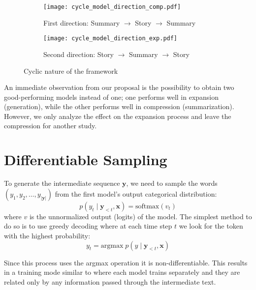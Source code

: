 \begin{figure}[ht]
    \centering
    \begin{subfigure}[b]{\textwidth}
        \centering
       \texttt{[image: cycle\_model\_direction\_comp.pdf]}
        \caption{First direction: Summary $\rightarrow$ Story $\rightarrow$ Summary}
        \label{fig:cycle_model_direction_comp}
    \end{subfigure}
    \newline \newline
    \begin{subfigure}[b]{\textwidth}
        \centering
       \texttt{[image: cycle\_model\_direction\_exp.pdf]}
        \caption{Second direction: Story $\rightarrow$ Summary $\rightarrow$ Story}
        \label{fig:cycle_model_direction_exp}
    \end{subfigure}
    \caption{Cyclic nature of the framework}
    \label{fig:cycle_directions}
\end{figure}

An immediate observation from our proposal is the possibility to obtain two good-performing models instead of one; one performs well in expansion (generation), while the other performs well in compression (summarization). However, we only analyze the effect on the expansion process and leave the compression for another study.



\section{Differentiable Sampling}
\label{sec:gumbel_softmax}

To generate the intermediate sequence $\mathbf{y}$, we need to sample the words $(y_1, y_2, \ldots, y_{|\mathbf{y}|})$ from the first model's output categorical distribution: 
\[ p(y_t \mid \mathbf{y}_{<t}, \mathbf{x}) = \text{softmax}(v_t) \]
where $v$ is the unnormalized output (logits) of the model. The simplest method to do so is to use greedy decoding where at each time step $t$ we look for the token with the highest probability:
\[ y_t = \text{argmax} \; p(y \mid \mathbf{y}_{<t}, \mathbf{x}) \]

Since this process uses the argmax operation it is non-differentiable. This results in a training mode similar to \citep{he2016dual} where each model trains separately and they are related only by any information passed through the intermediate text.

